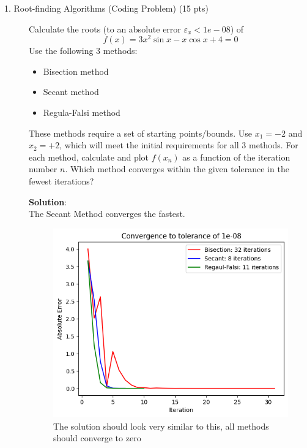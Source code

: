 \documentclass[12pt]{article}
\begin{document}
\begin{description}
\item[1. Root-finding Algorithms \color{red} (Coding Problem) \color{black} (15 pts)]
Calculate the roots (to an absolute error $\varepsilon_x < 1e-08$) of
    \begin{equation*}
        f (x) = 3x^{2}\sin{x} - x\cos{x} + 4 = 0
    \end{equation*}
Use the following 3 methods:
    \begin{itemize}
   	\item Bisection method
   	\item Secant method
   	\item Regula-Falsi method
    \end{itemize}

    These methods require a set of starting points/bounds. Use $x_1 = -2$ and $x_2 = +2$, which will meet the initial requirements for all 3 methods. For each method, calculate and plot $f(x_{n})$ as a function of the iteration number $n$. Which method converges within the given tolerance in the fewest iterations?
    
    \color{red}
    \ifsolution
    {\bf Solution}:\\ The Secant Method converges the fastest.
    
    \begin{figure}[h!]
    	\centering\includegraphics[width=4.5in]{HW1Fig1.png}
    	\caption{The solution should look very similar to this, all methods should converge to zero}
    	\label{fig:RootFindingAlgorithms}
    \end{figure}
    \fi
    \color{black}


\end{description}
\end{document}

